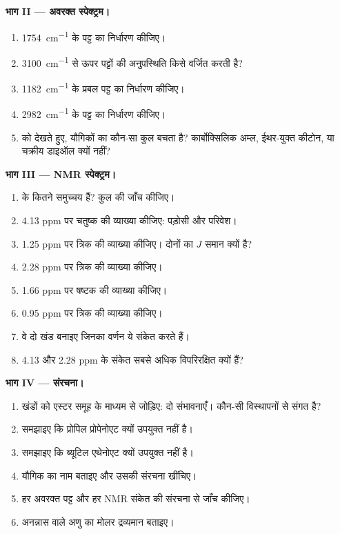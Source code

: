 \begin{problem}
\medskip
\noindent\textbf{भाग II --- अवरक्त स्पेक्ट्रम।}
\begin{enumerate}[resume]
  \item \qty{1754}{cm^{-1}} के पट्ट का निर्धारण कीजिए।
  \item \qty{3100}{cm^{-1}} से ऊपर पट्टों की अनुपस्थिति किसे वर्जित करती है?
  \item \qty{1182}{cm^{-1}} के प्रबल पट्ट का निर्धारण कीजिए।
  \item \qty{2982}{cm^{-1}} के पट्ट का निर्धारण कीजिए।
  \item {} को देखते हुए, यौगिकों का कौन-सा कुल
        बचता है? कार्बोक्सिलिक अम्ल, ईथर-युक्त कीटोन, या
        चक्रीय डाइऑल क्यों नहीं?
\end{enumerate}

\medskip
\noindent\textbf{भाग III --- NMR स्पेक्ट्रम।}
\begin{enumerate}[resume]
  \item {} के कितने समुच्चय हैं? कुल  की जाँच कीजिए।
  \item 4.13 ppm पर चतुष्क की व्याख्या कीजिए: पड़ोसी और परिवेश।
  \item 1.25 ppm पर त्रिक की व्याख्या कीजिए। दोनों का
        $J$ समान क्यों है?
  \item 2.28 ppm पर त्रिक की व्याख्या कीजिए।
  \item 1.66 ppm पर षष्टक की व्याख्या कीजिए।
  \item 0.95 ppm पर त्रिक की व्याख्या कीजिए।
  \item वे दो खंड बनाइए जिनका वर्णन ये संकेत करते हैं।
  \item 4.13 और 2.28 ppm के संकेत सबसे अधिक विपरिरक्षित क्यों हैं?
\end{enumerate}

\medskip
\noindent\textbf{भाग IV --- संरचना।}
\begin{enumerate}[resume]
  \item खंडों को एस्टर समूह के माध्यम से जोड़िए: दो संभावनाएँ।
        कौन-सी विस्थापनों से संगत है?
  \item समझाइए कि प्रोपिल प्रोपेनोएट क्यों उपयुक्त नहीं है।
  \item समझाइए कि ब्यूटिल एथेनोएट क्यों उपयुक्त नहीं है।
  \item यौगिक का नाम बताइए और उसकी संरचना खींचिए।
  \item हर अवरक्त पट्ट और हर NMR संकेत की संरचना से जाँच कीजिए।
  \item अनन्नास वाले अणु का मोलर द्रव्यमान बताइए।
\end{enumerate}
\end{problem}

